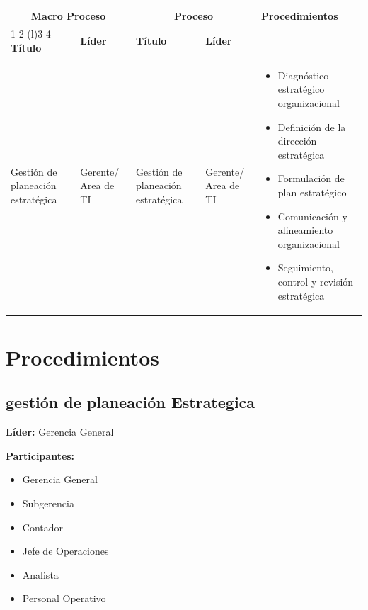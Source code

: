 \documentclass[11pt,letterpaper]{report}
\begin{document}
\vspace{7em}


\begin{center}
  \small
  \begin{tabularx}{\textwidth}{p{}p{}XXp{}}
  \toprule
  \multicolumn{2}{c}{\textbf{Macro Proceso}} & \multicolumn{2}{c}{\textbf{Proceso}} & \multirow{2}{*}{\textbf{Procedimientos}} \\
  \cmidrule(r){1-2} \cmidrule(l){3-4}
  \textbf{Título} & \textbf{Líder} & \textbf{Título} & \textbf{Líder} & \\
  \midrule
  Gestión de planeación estratégica & Gerente/ Area de TI & Gestión de planeación estratégica & Gerente/ Area de TI & 
  \begin{itemize} 
    \item Diagnóstico estratégico organizacional 
    \item Definición de la dirección estratégica 
    \item Formulación de plan estratégico 
    \item Comunicación y alineamiento organizacional 
    \item Seguimiento, control y revisión estratégica 
  \end{itemize} \\
  \bottomrule
  \end{tabularx}
\end{center}

\newpage

\chapter{Procedimientos}

\section{gestión de planeación Estrategica}
\textbf{Líder:} Gerencia General

\textbf{Participantes:}
\begin{itemize}
  \item Gerencia General
  \item Subgerencia
  \item Contador
  \item Jefe de Operaciones
  \item Analista 
  \item Personal Operativo
  
\end{itemize}
\end{document}
